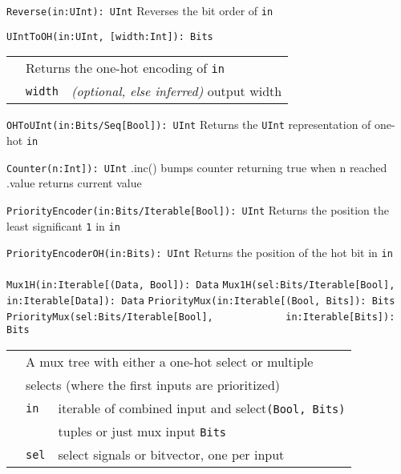 \documentclass[10pt,landscape]{article}
\begin{document}
\begin{multicols}{3}
\verb$Reverse(in:UInt): UInt$ \newline
\phantom{x} Reverses the bit order of \verb$in$

\verb$UIntToOH(in:UInt, [width:Int]): Bits$ \newline
\begin{tabular}{l l l}
& \multicolumn{2}{l}{Returns the one-hot encoding of \texttt{in}} \\
& \verb$width$ & {\em(optional, else inferred)} output width \\
\end{tabular}

\verb$OHToUInt(in:Bits/Seq[Bool]): UInt$ \newline
\phantom{x} Returns the \verb$UInt$ representation of one-hot \verb$in$

\verb$Counter(n:Int]): UInt$ \newline
\phantom{x} .inc() bumps counter returning true when n reached \newline
\phantom{x} .value returns current value

\verb$PriorityEncoder(in:Bits/Iterable[Bool]): UInt$ \newline
\phantom{x} Returns the position the least significant \verb$1$ in \verb$in$

\verb$PriorityEncoderOH(in:Bits): UInt$ \newline
\phantom{x} Returns the position of the hot bit in \verb$in$
\\
\\
{\color{blue}
\verb$Mux1H(in:Iterable[(Data, Bool]): Data$ \newline
\verb$Mux1H(sel:Bits/Iterable[Bool],$ \newline
\verb$      in:Iterable[Data]): Data$ \newline
\verb$PriorityMux(in:Iterable[(Bool, Bits]): Bits$ \newline
\verb$PriorityMux(sel:Bits/Iterable[Bool],$ \newline
\verb$            in:Iterable[Bits]): Bits$ \newline
}
\begin{tabular}{l l l}
& \multicolumn{2}{l}{A mux tree with either a one-hot select or multiple} \\
& \multicolumn{2}{l}{\phantom{x} selects (where the first inputs are prioritized)} \\
& \verb$in$ & iterable of combined input and select\verb$(Bool, Bits)$\\
& & tuples or just mux input \verb$Bits$ \\
& \verb$sel$ & select signals or bitvector, one per input \\
\end{tabular} \\


\end{multicols}
\end{document}
